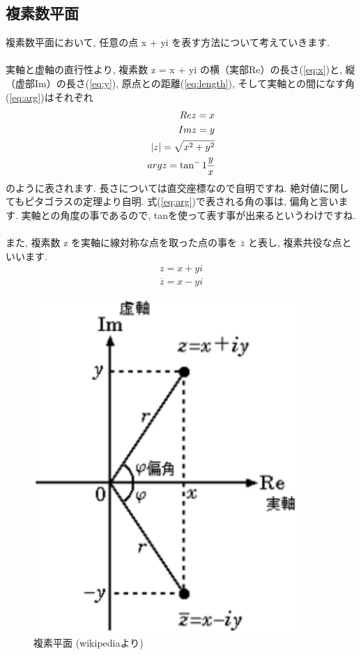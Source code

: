 \documentclass[11pt,a4paper]{jreport}
\begin{document}
\subsection{複素数平面}
複素数平面において, 任意の点 x + yi を表す方法について考えていきます. \\
\\
実軸と虚軸の直行性より, 複素数 z = x + yi の横（実部Re）の長さ(\ref{eq:x})と, 縦（虚部Im）の長さ(\ref{eq:y}), 原点との距離(\ref{eq:length}), そして実軸との間になす角(\ref{eq:arg})はそれぞれ
\begin{eqnarray}
\mathstrut Re z = x
\label{eq:x}
\\
\mathstrut Im z = y
\label{eq:y}
\\
|z| = \sqrt{x^2 + y^2}
\label{eq:length}\\
\mathstrut arg z = \tan^-1 \frac{y}{x}
\label{eq:arg}
\end{eqnarray}
のように表されます. 長さについては直交座標なので自明ですね. 絶対値に関してもピタゴラスの定理より自明. 式(\ref{eq:arg})で表される角の事は, 偏角と言います. 実軸との角度の事であるので, tanを使って表す事が出来るというわけですね.\\
\\
また, 複素数 z を実軸に線対称な点を取った点の事を $ \overline{z}$ と表し, 複素共役な点といいます.\\

\begin{eqnarray}
z = x + yi
\end{eqnarray}
\begin{eqnarray}
\overline{z} = x - yi
\end{eqnarray}

\begin{figure}[H]
\label{im:complex}
  \centering
  \includegraphics[width=100mm,bb=0 0 220 279]{figures/Complex.png}
  \caption{複素平面 (wikipediaより)}
\end{figure}
\end{document}
